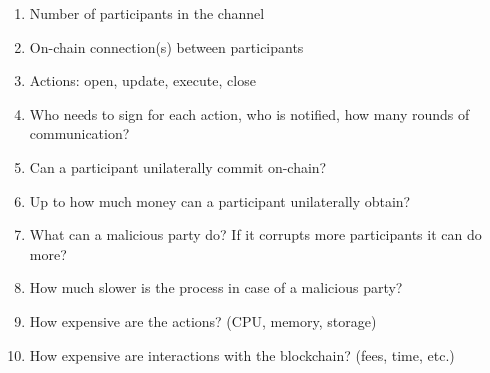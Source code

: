\begin{enumerate}
  \item Number of participants in the channel
  \item On-chain connection(s) between participants
  \item Actions: open, update, execute, close
  \item Who needs to sign for each action, who is notified, how many rounds of
  communication?
  \item Can a participant unilaterally commit on-chain?
  \item Up to how much money can a participant unilaterally obtain?
  \item What can a malicious party do? If it corrupts more participants it can do more?
  \item How much slower is the process in case of a malicious party?
  \item How expensive are the actions? (CPU, memory, storage)
  \item How expensive are interactions with the blockchain? (fees, time, etc.)
\end{enumerate}
